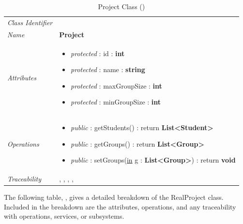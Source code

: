 \documentclass[12pt,letterpaper]{article}
\begin{document}
\begin{table}[H]
    \caption{Project Class ()} 
	\begin{tabu} to 
		\toprule
		Class Identifier &  \\
		Name & {\bf Project} \\
		Attributes & 
		\begin{minipage}[t]{\linewidth}
		    \begin{itemize}
		        \item \textit{protected} : id : {\bf int}
		        \item \textit{protected} : name : {\bf string}
		        \item \textit{protected} : maxGroupSize : {\bf int}
		        \item \textit{protected} : minGroupSize : {\bf int}
			\end{itemize}
	    \end{minipage} \\

		Operations &
		\begin{minipage}[t]{\linewidth}
			\begin{itemize}
			    \item {\it public} : getStudents() : return {\bf List<Student>}
			    \item {\it public} : getGroups() : return {\bf List<Group>}
			    \item {\it public} : setGroups(\underline{in} g : {\bf List<Group>}) : return {\bf void}
	        \end{itemize}
	    \end{minipage} \\
	    	Traceability & , , , , \\
		\toprule
	\end{tabu}
\end{table}

The following table, , gives a detailed breakdown of the RealProject class. Included in the breakdown are the attributes, operations, and any traceability with operations, services, or subsystems.
\end{document}
